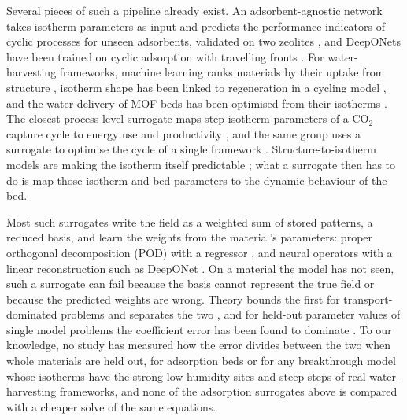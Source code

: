 \documentclass[10pt,a4paper]{article}
\begin{document}
Several pieces of such a pipeline already exist. An adsorbent-agnostic network takes
isotherm parameters as input and predicts the performance indicators of cyclic processes
for unseen adsorbents, validated on two zeolites \cite{pai2020generalized,pai2022experimental},
and DeepONets have been trained on cyclic adsorption with travelling fronts
\cite{ceccanti2026deep}. For water-harvesting frameworks, machine learning ranks materials
by their uptake from structure \cite{alkhatib2026machine,arjmandi2026next,abdelwadood2026ai},
isotherm shape has been linked to regeneration in a cycling model \cite{bezrukov2023metal},
and the water delivery of MOF beds has been optimised from their isotherms
\cite{harriman2025optimizing}. The closest process-level surrogate maps step-isotherm
parameters of a CO\(_2\) capture cycle to energy use and productivity
\cite{nasiri2026process}, and the same group uses a surrogate to optimise the cycle of a
single framework \cite{nasiri2026surrogate}. Structure-to-isotherm models are making the
isotherm itself predictable \cite{goeminne2025ab}; what a surrogate then has to do is map
those isotherm and bed parameters to the dynamic behaviour of the bed.

Most such surrogates write the field as a weighted sum of stored patterns, a reduced
basis, and learn the weights from the material's parameters: proper orthogonal
decomposition (POD) with a regressor \cite{hesthaven2018non,bhattacharya2021model}, and
neural operators with a linear reconstruction such as DeepONet \cite{lu2021learning}. On a
material the model has not seen, such a surrogate can fail because the basis cannot
represent the true field or because the predicted weights are wrong. Theory bounds the
first for transport-dominated problems \cite{lanthaler2023nonlinear} and separates the
two \cite{bhattacharya2021model,lanthaler2022error,brivio2024error,wang2025rbdeeponet}, and
for held-out parameter values of single model problems the coefficient error has been
found to dominate \cite{halder2022non,franco2023mesh,heinlein2026error}. To our knowledge,
no study has measured how the error divides between the two when whole materials are held
out, for adsorption beds or for any breakthrough model whose isotherms have the strong
low-humidity sites and steep steps of real water-harvesting frameworks, and none of the
adsorption surrogates above is compared with a cheaper solve of the same equations.
\end{document}
